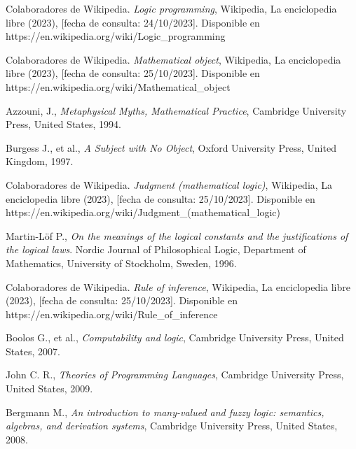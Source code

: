\begin{thebibliography}{11}
    \bibitem{}
    \label{sec:57}
    \hypertarget{57}{}
    Colaboradores de Wikipedia. \textit{Logic programming}, Wikipedia, La enciclopedia libre (2023), [fecha de consulta: 24/10/2023]. Disponible en https://en.wikipedia.org/wiki/Logic\_programming

    \bibitem{}
    \label{sec:58}
    \hypertarget{58}{}
    Colaboradores de Wikipedia. \textit{Mathematical object}, Wikipedia, La enciclopedia libre (2023), [fecha de consulta: 25/10/2023]. Disponible en https://en.wikipedia.org/wiki/Mathematical\_object

    \bibitem{}
    \label{sec:59}
    \hypertarget{59}{}
    Azzouni, J.,  \textit{Metaphysical Myths, Mathematical Practice}, Cambridge University Press, United States, 1994.

    \bibitem{}
    \label{sec:60}
    \hypertarget{60}{}
    Burgess J., et al., \textit{A Subject with No Object}, Oxford University Press, United Kingdom, 1997.
    
    \bibitem{}
    \label{sec:61}
    \hypertarget{61}{}
    Colaboradores de Wikipedia. \textit{Judgment (mathematical logic)}, Wikipedia, La enciclopedia libre (2023), [fecha de consulta: 25/10/2023]. Disponible en https://en.wikipedia.org/wiki/Judgment\_(mathematical\_logic)

    \bibitem{}
    \label{sec:62}
    \hypertarget{62}{}
    Martin-Löf P., \textit{On the meanings of the logical constants and the justifications of the logical laws}. Nordic Journal of Philosophical Logic, Department of Mathematics, University of Stockholm, Sweden, 1996.%

    \bibitem{}
    \label{sec:63}
    \hypertarget{63}{}
    Colaboradores de Wikipedia. \textit{Rule of inference}, Wikipedia, La enciclopedia libre (2023), [fecha de consulta: 25/10/2023]. Disponible en https://en.wikipedia.org/wiki/Rule\_of\_inference

    \bibitem{}
    \label{sec:64}
    \hypertarget{64}{}
    Boolos G., et al., \textit{Computability and logic}, Cambridge University Press, United States, 2007. %

    \bibitem{}
    \label{sec:65}
    \hypertarget{65}{}
    John C. R., \textit{Theories of Programming Languages}, Cambridge University Press, United States, 2009.%
    
    \bibitem{}
    \label{sec:66}
    \hypertarget{66}{}
    Bergmann M.,  \textit{An introduction to many-valued and fuzzy logic: semantics, algebras, and derivation systems}, Cambridge University Press, United States, 2008.%


\end{thebibliography}
